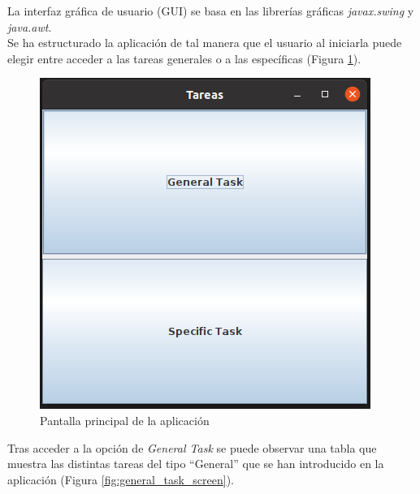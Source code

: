 \documentclass[10pt,a4paper]{article}
\begin{document}
La interfaz gráfica de usuario (GUI) se basa en las librerías gráficas \emph{javax.swing} y \emph{java.awt}.\\
Se ha estructurado la aplicación de tal manera que el usuario al iniciarla puede elegir entre acceder a las tareas generales o a las específicas (Figura \ref{fig:main_screen}).

\begin{figure}[h!]
\centering
\includegraphics[scale=0.4]{images/main_screen.png}
\caption{Pantalla principal de la aplicación}
\label{fig:main_screen}
\end{figure}

Tras acceder a la opción de \emph{General Task} se puede observar una tabla que muestra las distintas tareas del tipo ``General'' que se han introducido en la aplicación (Figura \ref{fig:general_task_screen}).
\end{document}
